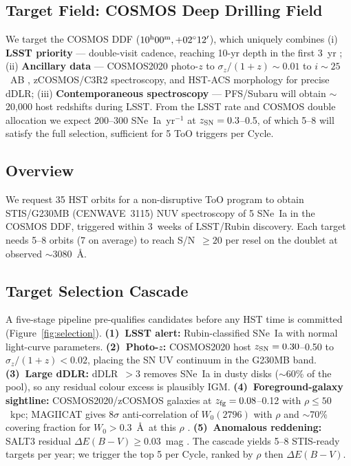 \documentclass[12pt]{article}
\begin{document}
\subsection*{Target Field: COSMOS Deep Drilling Field}

We target the COSMOS DDF ($10^{\rm h}00^{\rm m}, +02^\circ12'$), which
uniquely combines (i) \textbf{LSST priority} --- double-visit cadence,
reaching 10-yr depth in the first 3~yr \citep{GrisDDF2024}; (ii)
\textbf{Ancillary data} --- COSMOS2020 photo-$z$ to
$\sigma_z/(1+z)\sim0.01$ to $i\sim25$~AB \citep{Weaver2022},
zCOSMOS/C3R2 spectroscopy, and HST-ACS morphology for precise dDLR;
(iii) \textbf{Contemporaneous spectroscopy} --- PFS/Subaru will obtain
$\sim$20{,}000 host redshifts during LSST. From the LSST rate and COSMOS
double allocation we expect 200--300 SNe~Ia~yr$^{-1}$ at
$z_{\rm SN}=0.3$--0.5, of which 5--8 will satisfy the full selection,
sufficient for 5 ToO triggers per Cycle.


\describeobservations %

\subsection*{Overview}

We request 35 HST orbits for a non-disruptive ToO program to obtain
STIS/G230MB (CENWAVE~3115) NUV spectroscopy of 5 SNe~Ia in the COSMOS
DDF, triggered within 3~weeks of LSST/Rubin discovery. Each target
needs 5--8 orbits (7 on average) to reach S/N~$\geq20$ per resel on
the  doublet at observed $\sim$3080~\AA.

\subsection*{Target Selection Cascade}

A five-stage pipeline pre-qualifies candidates before any HST time is
committed (Figure~\ref{fig:selection}). \textbf{(1)~LSST alert:}
Rubin-classified SNe~Ia with normal light-curve parameters.
\textbf{(2)~Photo-$z$:} COSMOS2020 host $z_{\rm SN}=0.30$--0.50 to
$\sigma_z/(1+z)<0.02$, placing the SN UV continuum in the G230MB band.
\textbf{(3)~Large dDLR:} dDLR~$>3$ \citep{Sullivan2006} removes SNe~Ia
in dusty disks ($\sim$60\% of the pool), so any residual colour excess
is plausibly IGM. \textbf{(4)~Foreground-galaxy sightline:}
COSMOS2020/zCOSMOS galaxies at $z_{\rm fg}=0.08$--0.12 with
$\rho\leq50$~kpc; MAGIICAT gives 8$\sigma$ anti-correlation of
$W_0(2796)$ with $\rho$ and $\sim$70\% covering fraction for
$W_0>0.3$~\AA\ at this $\rho$ \citep{Nielsen2013, Dutta2020}.
\textbf{(5)~Anomalous reddening:} SALT3 residual
$\Delta E(B-V)\geq0.03$~mag \citep{Menard2010, Menard2026}. The cascade
yields 5--8 STIS-ready targets per year; we trigger the top 5 per
Cycle, ranked by $\rho$ then $\Delta E(B-V)$.
\end{document}
